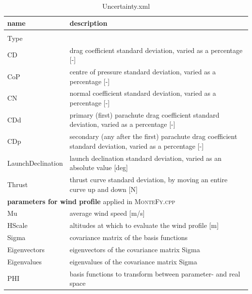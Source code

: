 \documentclass[11pt, a4paper]{article}
\newcommand{\loc}[1]{{\footnotesize \textsc{#1}}}
\begin{document}
\begin{table}
  \centering
  \caption{Uncertainty.xml}
  \label{tab:uncertainty_xml}
  \begin{tabular}{l p{11cm}}
    \textbf{name} & \textbf{description} \\
    \hline \\
    Type & \\
    CD & drag coefficient standard deviation, varied as a percentage [-] \\
    CoP & centre of pressure standard deviation, varied as a percentage [-] \\
    CN & normal coefficient standard deviation, varied as a percentage [-] \\
    CDd & primary (first) parachute drag coefficient standard deviation, varied as a percentage [-] \\
    CDp & secondary (any after the first) parachute drag coefficient standard deviation, varied as a percentage [-] \\
    LaunchDeclination & launch declination standard deviation, varied as an absolute value [deg] \\
    Thrust & thrust curve standard deviation, by moving an entire curve up and down [N] \\
    \multicolumn{2}{l}{\textbf{parameters for wind profile} applied in \loc{MonteFy.cpp} } \\
    Mu & average wind speed [m/s] \\
    HScale & altitudes at which to evaluate the wind profile [m] \\
    Sigma & covariance matrix of the basis functions \\
    Eigenvectors & eigenvectors of the covariance matrix Sigma \\
    Eigenvalues & eigenvalues of the covariance matrix Sigma \\
    PHI & basis functions to transform between parameter- and real space \\
  \end{tabular}
\end{table}
\end{document}

